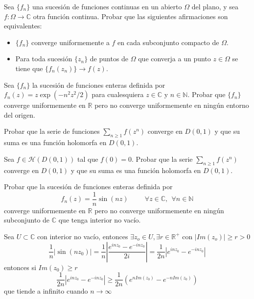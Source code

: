 \begin{ejer}
	Sea $\{f_n\}$ una sucesión de funciones continuas en un abierto $\Omega$ del plano, y sea $f:\Omega\rightarrow\mathbb{C}$ otra función continua. Probar que las siguientes afirmaciones son equivalentes:
	\begin{itemize}
		\item $\{f_n\}$ converge uniformemente a $f$ en cada subconjunto compacto de $\Omega$.
		\item Para toda sucesión $\{z_n\}$ de puntos de $\Omega$ que converja a un punto $z\in\Omega$ se tiene que $\{f_n(z_n)\}\rightarrow f(z)$.
	\end{itemize}
\end{ejer}

\begin{ejer}
	Sea $\{f_n\}$ la sucesión de funciones enteras definida por $f_n(z) = z\exp(-n^2z^2/2)$ para cualesquiera $z\in\mathbb{C}$ y $n\in\mathbb{N}$. Probar que $\{f_n\}$ converge uniformemente en $\mathbb{R}$ pero no converge uniformemente en ningún entorno del origen.
\end{ejer}

\begin{ejer}
	Probar que la serie de funciones $\sum_{n\geq 1} f(z^n)$ converge en $D(0,1)$ y que su suma es una función holomorfa en $D(0,1)$.
\end{ejer}

\begin{ejer}
	Sea $f\in\mathcal{H}(D(0,1))$ tal que $f(0)=0$.
	Probar que la serie $\sum_{n\geq 1}f(z^n)$ converge en $D(0,1)$ y que su suma es una función holomorfa en $D(0,1)$.
\end{ejer}

\begin{ejer}
	Probar que la sucesión de funciones enteras definida por
	$$ f_n(z) = \frac{1}{n}\sin(nz) \hspace{1cm} \forall z\in\mathbb{C}, \ \ \forall n\in\mathbb{N} $$
	converge uniformemente en $\mathbb{R}$ pero no converge uniformemente en ningún subconjunto de $\mathbb{C}$ que tenga interior no vacío.
\end{ejer}
\begin{sol}
Sea $U\subset \mathbb{C}$ con interior no vacío, entonces $\exists z_o\in U, \exists r\in\mathbb{R}^+$ con $|Im(z_o)| \geq r > 0$
$$\frac{1}{n}|\sin(nz_0)| = \frac{1}{n}\left| \frac{e^{inz_0}-e^{-inz_0}}{2i} \right|= \frac{1}{2n} \left| e^{inz_0} - e^{-inz_0} \right|$$
entonces si $Im(z_0)\geq r$
$$\frac{1}{2n} \left| e^{inz_0} - e^{-inz_0} \right|  \geq \frac{1}{2n} \left( e^{nIm(z_0)} -e^{-nIm(z_0)} \right)  $$
que tiende a infinito cuando $n\rightarrow\infty$
\end{sol}

